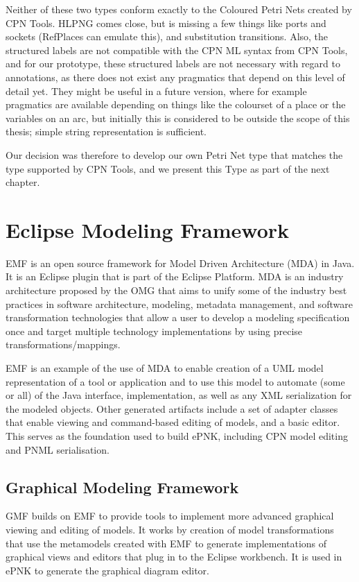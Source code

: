 Neither of these two types conform exactly to the Coloured Petri Nets created by
CPN Tools. HLPNG comes close, but is missing a few things like ports and sockets
(RefPlaces can emulate this), and substitution transitions. Also, the
structured labels are not compatible with the CPN ML syntax from CPN Tools, and
for our prototype, these structured labels are not necessary with regard to
annotations, as there does not exist any pragmatics that depend on this level
of detail yet. They might be useful in a future version, where for example
pragmatics are available depending on things like the colourset of a place or
the variables on an arc, but initially this is considered to be outside the
scope of this thesis; simple string representation is sufficient.

Our decision was therefore to develop our own Petri Net type that matches the
type supported by CPN Tools, and we present this Type as part of the next
chapter.

\section{Eclipse Modeling Framework}
EMF is an open source framework for Model Driven Architecture (MDA) in Java. It
is an Eclipse plugin that is part of the Eclipse Platform. MDA is an
industry architecture proposed by the OMG that aims to unify some of the
industry best practices in software architecture, modeling, metadata management,
and software transformation technologies that allow a user to develop a
modeling specification once and target multiple technology implementations by
using precise transformations/mappings. 

EMF is an example of the use of MDA to enable creation of a UML model
representation of a tool or application and to use this model to automate (some
or all) of the Java interface, implementation, as well as any XML serialization
for the modeled objects.
Other generated artifacts include a set of adapter classes that enable
viewing and command-based editing of models, and a basic editor. This serves as
the foundation used to build ePNK, including CPN model editing and PNML
serialisation.

	\subsection{Graphical Modeling Framework}
	GMF builds on EMF to provide tools to implement more advanced graphical viewing
	and editing of models. It works by creation of model transformations that use
	the metamodels created with EMF to generate implementations of graphical views and
	editors that plug in to the Eclipse workbench. It is used in ePNK to generate
	the graphical diagram editor.
	
